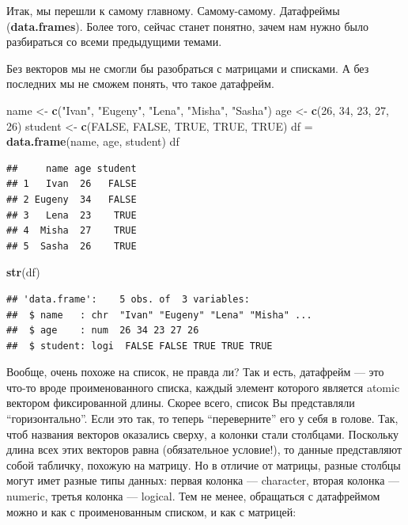 \documentclass[
]{book}
\newenvironment{Shaded}{\begin{snugshade}}{\end{snugshade}}
\newcommand{\DecValTok}[1]{\textcolor[rgb]{0.00,0.00,0.81}{#1}}
\newcommand{\KeywordTok}[1]{\textcolor[rgb]{0.13,0.29,0.53}{\textbf{#1}}}
\newcommand{\NormalTok}[1]{#1}
\newcommand{\OtherTok}[1]{\textcolor[rgb]{0.56,0.35,0.01}{#1}}
\newcommand{\StringTok}[1]{\textcolor[rgb]{0.31,0.60,0.02}{#1}}
\begin{document}
Итак, мы перешли к самому главному. Самому-самому. Датафреймы (\textbf{data.frames}). Более того, сейчас станет понятно, зачем нам нужно было разбираться со всеми предыдущими темами.

Без векторов мы не смогли бы разобраться с матрицами и списками. А без последних мы не сможем понять, что такое датафрейм.

\begin{Shaded}
\begin{Highlighting}[]
\NormalTok{name <-}\StringTok{ }\KeywordTok{c}\NormalTok{(}\StringTok{"Ivan"}\NormalTok{, }\StringTok{"Eugeny"}\NormalTok{, }\StringTok{"Lena"}\NormalTok{, }\StringTok{"Misha"}\NormalTok{, }\StringTok{"Sasha"}\NormalTok{) }
\NormalTok{age <-}\StringTok{ }\KeywordTok{c}\NormalTok{(}\DecValTok{26}\NormalTok{, }\DecValTok{34}\NormalTok{, }\DecValTok{23}\NormalTok{, }\DecValTok{27}\NormalTok{, }\DecValTok{26}\NormalTok{) }
\NormalTok{student <-}\StringTok{ }\KeywordTok{c}\NormalTok{(}\OtherTok{FALSE}\NormalTok{, }\OtherTok{FALSE}\NormalTok{, }\OtherTok{TRUE}\NormalTok{, }\OtherTok{TRUE}\NormalTok{, }\OtherTok{TRUE}\NormalTok{) }
\NormalTok{df =}\StringTok{ }\KeywordTok{data.frame}\NormalTok{(name, age, student)  }
\NormalTok{df}
\end{Highlighting}
\end{Shaded}

\begin{verbatim}
##     name age student
## 1   Ivan  26   FALSE
## 2 Eugeny  34   FALSE
## 3   Lena  23    TRUE
## 4  Misha  27    TRUE
## 5  Sasha  26    TRUE
\end{verbatim}

\begin{Shaded}
\begin{Highlighting}[]
\KeywordTok{str}\NormalTok{(df)}
\end{Highlighting}
\end{Shaded}

\begin{verbatim}
## 'data.frame':    5 obs. of  3 variables:
##  $ name   : chr  "Ivan" "Eugeny" "Lena" "Misha" ...
##  $ age    : num  26 34 23 27 26
##  $ student: logi  FALSE FALSE TRUE TRUE TRUE
\end{verbatim}

Вообще, очень похоже на список, не правда ли? Так и есть, датафрейм --- это что-то вроде проименованного списка, каждый элемент которого является atomic вектором фиксированной длины. Скорее всего, список Вы представляли ``горизонтально''. Если это так, то теперь ``переверните'' его у себя в голове. Так, чтоб названия векторов оказались сверху, а колонки стали столбцами. Поскольку длина всех этих векторов равна (обязательное условие!), то данные представляют собой табличку, похожую на матрицу. Но в отличие от матрицы, разные столбцы могут имет разные типы данных: первая колонка --- character, вторая колонка --- numeric, третья колонка --- logical. Тем не менее, обращаться с датафреймом можно и как с проименованным списком, и как с матрицей:
\end{document}
